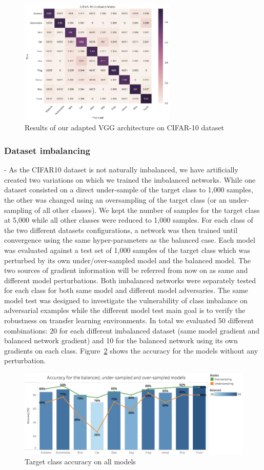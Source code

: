 \documentclass[runningheads,a4paper]{llncs}
\begin{document}
\begin{figure}
	\centering
	\includegraphics[height=6.0cm]{conf_matrix.png}
	\caption{Results of our adapted VGG architecture on CIFAR-10 dataset}
	\label{fig:conf_matrix_full}
\end{figure}

\subsubsection{Dataset imbalancing} - As the CIFAR10 dataset is not naturally imbalanced, we have artificially created two variations on which we trained the imbalanced networks.  While one dataset consisted on a direct under-sample of the target class to 1,000 samples, the other was changed using  an oversampling of the target class (or an under-sampling of all other classes). We kept the number of samples for the target class at 5,000 while all other classes were reduced to 1,000 samples. For each class of the two different datasets configurations, a network was then trained until convergence using the same hyper-parameters as the balanced case. Each model was evaluated against a test set of 1,000 samples of the target class which was  perturbed by its own under/over-sampled model and the balanced model. The two sources of gradient information will be referred from now on as same and different model perturbations. Both imbalanced networks were separately tested for each class for both same model and different model adversaries. The same model test was designed to investigate the vulnerability of class imbalance on adversarial examples while the different model test main goal is to verify the robustness on transfer learning environments. In total we evaluated 50 different combinations: 20 for each different imbalanced dataset (same model gradient and balanced network gradient) and 10 for the balanced network using its own gradients on each class. Figure~\ref{fig:acc_graph} shows the accuracy for the models without any perturbation.
\begin{figure}
	\centering
	\includegraphics[height=4.2cm]{graph_non_pert.png}
	\caption{Target class accuracy on all models}
	\label{fig:acc_graph}
\end{figure}
\end{document}
